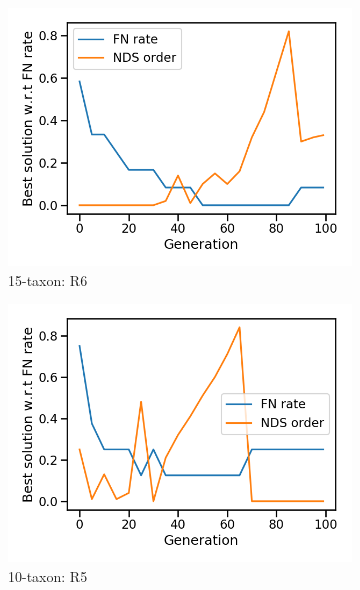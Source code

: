 \begin{figure}[!h]
\begin{subfigure}[b]{0.33\textwidth}
		\includegraphics[width=\textwidth]{Figure/15-taxon_R6_runx_nds_order}
		\caption{15-taxon: R6}
\end{subfigure}
	\begin{subfigure}[b]{0.33\textwidth}
		\includegraphics[width=\textwidth]{Figure/10-taxon_R5_run2_nds_order}
		\caption{10-taxon: R5}
\end{subfigure}\begin{subfigure}[b]{0.33\textwidth}

\end{subfigure}
\end{figure}
